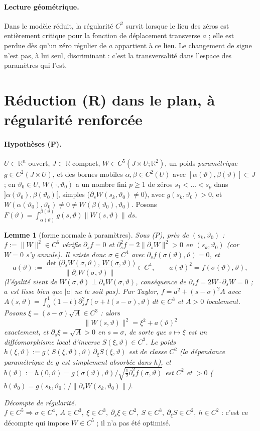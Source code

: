 \documentclass[11pt,a4paper]{article}
\newtheorem{lemme}[theoreme]{Lemme}
\theoremstyle{remark}
\newcommand{\R}{\mathbb R}
\newcommand{\vth}{\vartheta}
\begin{document}
\paragraph{Lecture géométrique.} Dans le modèle réduit, la régularité $C^2$ survit lorsque le lieu des zéros est entièrement critique pour la fonction de déplacement transverse $a$ ; elle est perdue dès qu'un zéro régulier de $a$ appartient à ce lieu. Le changement de signe n'est pas, à lui seul, discriminant : c'est la transversalité dans l'espace des paramètres qui l'est.

\section{Réduction (R) dans le plan, à régularité renforcée}\label{sec:R}
\paragraph{Hypothèses (P).} $U\subset\R^n$ ouvert, $J\subset\R$ compact, $W\in C^5(J\times U;\R^2)$, un poids \emph{paramétrique} $g\in C^2(J\times U)$, et des bornes mobiles $\alpha,\beta\in C^2(U)$ avec $[\alpha(\vth),\beta(\vth)]\subset J$ ; en $\vth_0\in U$, $W(\cdot,\vth_0)$ a un nombre fini $p\ge1$ de zéros $s_1<\dots<s_p$ dans $]\alpha(\vth_0),\beta(\vth_0)[$, simples ($\partial_sW(s_k,\vth_0)\ne0$), avec $g(s_k,\vth_0)>0$, et $W(\alpha(\vth_0),\vth_0)\ne0\ne W(\beta(\vth_0),\vth_0)$. Posons $F(\vth)=\int_{\alpha(\vth)}^{\beta(\vth)}g(s,\vth)\lVert W(s,\vth)\rVert\,ds$.

\begin{lemme}[forme normale à paramètres]\label{lem:morse}
Sous (P), près de $(s_k,\vth_0)$ : $f:=\lVert W\rVert^2\in C^5$ vérifie $\partial_sf=0$ et $\partial_s^2f=2\lVert\partial_sW\rVert^2>0$ en $(s_k,\vth_0)$ (car $W=0$ s'y annule). Il existe donc $\sigma\in C^4$ avec $\partial_sf(\sigma(\vth),\vth)=0$, et
\[
a(\vth):=\frac{\det\bigl(\partial_sW(\sigma,\vth),\,W(\sigma,\vth)\bigr)}{\lVert\partial_sW(\sigma,\vth)\rVert}\in C^4,\qquad a(\vth)^2=f(\sigma(\vth),\vth),
\]
(l'égalité vient de $W(\sigma,\vth)\perp\partial_sW(\sigma,\vth)$, conséquence de $\partial_sf=2W\cdot\partial_sW=0$ ; $a$ est lisse bien que $\lvert a\rvert$ ne le soit pas). Par Taylor, $f=a^2+(s-\sigma)^2A$ avec $A(s,\vth)=\int_0^1(1-t)\partial_s^2f(\sigma+t(s-\sigma),\vth)\,dt\in C^3$ et $A>0$ localement. Posons $\xi=(s-\sigma)\sqrt A\in C^3$ : alors
\[
\boxed{\ \lVert W(s,\vth)\rVert^2=\xi^2+a(\vth)^2\ }
\]
exactement, et $\partial_s\xi=\sqrt A>0$ en $s=\sigma$, de sorte que $s\mapsto\xi$ est un difféomorphisme local d'inverse $S(\xi,\vth)\in C^3$. Le poids $h(\xi,\vth):=g(S(\xi,\vth),\vth)\,\partial_\xi S(\xi,\vth)$ est de classe $C^2$ (la dépendance paramétrique de $g$ est simplement absorbée dans $h$), et $b(\vth):=h(0,\vth)=g(\sigma(\vth),\vth)/\sqrt{\tfrac12\partial_s^2f(\sigma,\vth)}$ est $C^2$ et $>0$ ($b(\vth_0)=g(s_k,\vth_0)/\lVert\partial_sW(s_k,\vth_0)\rVert$).
\end{lemme}
\emph{Décompte de régularité.} $f\in C^5\Rightarrow\sigma\in C^4,\ A\in C^3,\ \xi\in C^3,\ \partial_s\xi\in C^2,\ S\in C^3,\ \partial_\xi S\in C^2,\ h\in C^2$ : c'est ce décompte qui impose $W\in C^5$ ; il n'a pas été optimisé.
\end{document}
